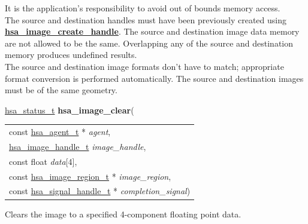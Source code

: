 \documentclass[final]{book}
\newcommand{\hsaarg}[1]{\textit{#1}}
\newcommand{\reffun}[1]{\textbf{#1}}
\begin{document}
\begin{appendices}
It is the application's responsibility to avoid out of bounds memory access.\\[2mm]
The source and destination handles must have been previously created using \hyperlink{group--images-1gad80ea369867549c5b313c08134beec83}{\reffun{hsa_image_create_handle}}. The source and destination image data memory are not allowed to be the same. Overlapping any of the source and destination memory produces undefined results.\\[2mm]
The source and destination image formats don't have to match; appropriate format conversion is performed automatically. The source and destination images must be of the same geometry. 


\noindent\begin{tcolorbox}[breakable,nobeforeafter,colframe=white,colback=lightgray,left=0mm]
\hyperlink{group--status-1gad755322e7ff95456520e8abdbe90d225}{hsa_status_t} \hypertarget{group--images-1ga634c0f4531359ca9b16e89ca577c02df}{\textbf{hsa_image_clear}}(
\vspace{-3.5mm}\begin{longtable}{@{}p{\textwidth}}
\hspace{1.7em}const \hyperlink{group--topology-1gab8db3fb886332a24acac08ec361e1d86}{hsa_agent_t} * \hsaarg{agent},\\
\hspace{1.7em}\hyperlink{group--images-1ga0aeecea8e818df4cec2eccb3a5e85d5f}{hsa_image_handle_t} \hsaarg{image_handle},\\
\hspace{1.7em}const float \hsaarg{data}[4],\\
\hspace{1.7em}const \hyperlink{group--images-1ga9d9acd37f7eb5a68c81b63b5ad082529}{hsa_image_region_t} * \hsaarg{image_region},\\
\hspace{1.7em}const \hyperlink{group--signals-1ga6592c136d70853d855bc11d9efdbf534}{hsa_signal_handle_t} * \hsaarg{completion_signal})\end{longtable}

\end{tcolorbox}
Clears the image to a specified 4-component floating point data.


\end{appendices}
\end{document}
